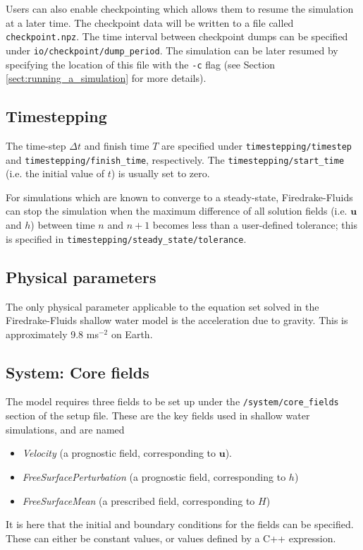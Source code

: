 \documentclass[a4paper,11pt]{report}
\begin{document}
Users can also enable checkpointing which allows them to resume the simulation at a later time. The checkpoint data will be written to a file called \texttt{checkpoint.npz}. The time interval between checkpoint dumps can be specified under \texttt{io/checkpoint/dump\_period}. The simulation can be later resumed by specifying the location of this file with the \texttt{-c} flag (see Section \ref{sect:running_a_simulation} for more details).

\subsection{Timestepping}
The time-step $\Delta t$ and finish time $T$ are specified under \texttt{timestepping/timestep} and \texttt{timestepping/finish\_time}, respectively. The \texttt{timestepping/start\_time} (i.e. the initial value of $t$) is usually set to zero.

For simulations which are known to converge to a steady-state, Firedrake-Fluids can stop the simulation when the maximum difference of all solution fields (i.e. $\mathbf{u}$ and $h$) between time $n$ and $n+1$ becomes less than a user-defined tolerance; this is specified in \texttt{timestepping/steady\_state/tolerance}.

\subsection{Physical parameters}
The only physical parameter applicable to the equation set solved in the Firedrake-Fluids shallow water model is the acceleration due to gravity. This is approximately 9.8 ms$^{-2}$ on Earth.

\subsection{System: Core fields}
The model requires three fields to be set up under the \texttt{/system/core\_fields} section of the setup file. These are the key fields used in shallow water simulations, and are named
\begin{itemize}
   \item \textit{Velocity} (a prognostic field, corresponding to $\mathbf{u}$).
   \item \textit{FreeSurfacePerturbation} (a prognostic field, corresponding to $h$)
   \item \textit{FreeSurfaceMean} (a prescribed field, corresponding to $H$)
\end{itemize}
It is here that the initial and boundary conditions for the fields can be specified. These can either be constant values, or values defined by a C++ expression.
\end{document}
